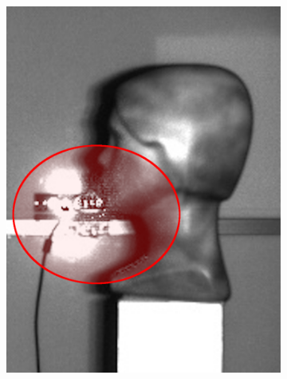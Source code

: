 \begin{figure}[h]
\begin{subfigure}[b]{0.2\textwidth}
		\includegraphics[width=\textwidth]{figures/depth_ir-b.png}
		\caption{}
		\label{fig:depthir:b}
	\end{subfigure}
	\hfill
	\begin{subfigure}[b]{0.2\textwidth}
		\centering

\end{subfigure}
\end{figure}
